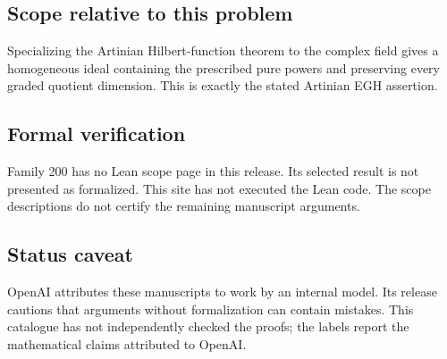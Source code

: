\documentclass[11pt]{article}
\begin{document}
\subsection{Scope relative to this problem}
Specializing the Artinian Hilbert-function theorem to the complex field gives a homogeneous ideal containing the prescribed pure powers and preserving every graded quotient dimension. This is exactly the stated Artinian EGH assertion.

\subsection{Formal verification}
Family 200 has no Lean scope page in this release. Its selected result is not presented as formalized. This site has not executed the Lean code. The scope descriptions do not certify the remaining manuscript arguments.

\subsection{Status caveat}
OpenAI attributes these manuscripts to work by an internal model. Its release cautions that arguments without formalization can contain mistakes. This catalogue has not independently checked the proofs; the labels report the mathematical claims attributed to OpenAI.
\end{document}
